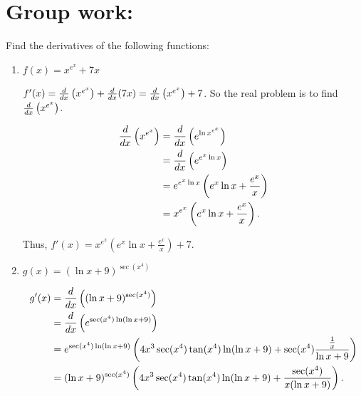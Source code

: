 \documentclass[nooutcomes]{ximera}
\begin{document}
		
		

	
	
	
	
	

\section*{Group work:}



\begin{problem}
Find the derivatives of the following functions:
	\begin{enumerate}
	
	\item  $f(x) = x^{e^x} + 7x$
		\begin{freeResponse}
		$f'(x) = \frac{d}{dx} \left(x^{e^x} \right) + \frac{d}{dx}(7x) = \frac{d}{dx} \left(x^{e^x} \right) + 7$.  So the real problem is to find $\frac{d}{dx} \left(x^{e^x} \right)$.  
		
		\begin{align*}
		\frac{d}{dx} \left( x^{e^x} \right) &= \frac{d}{dx} \left( e^{\ln x^{e^x}} \right) \\
		&= \frac{d}{dx} \left( e^{e^x \ln x} \right) \\
		&= e^{e^x \ln x} \left( e^x \ln x + \frac{e^x}{x} \right) \\
		&= x^{e^x} \left( e^x \ln x + \frac{e^x}{x} \right).
		\end{align*}
		
		Thus, $f'(x) = x^{e^x} \left( e^x \ln x + \frac{e^x}{x} \right) + 7$.  
		
		\end{freeResponse}
		
		
		
	\item  $g(x) = (\ln x + 9)^{\sec(x^4)}$
		\begin{freeResponse}
			\begin{align*}
			g'(x) &= \frac{d}{dx} \left( (\ln x + 9)^{\sec(x^4)} \right) \\
			&= \frac{d}{dx} \left( e^{\sec(x^4) \ln ( \ln x + 9) } \right) \\
			&= e^{\sec(x^4) \ln ( \ln x + 9)} \left( 4x^3 \sec(x^4) \tan(x^4) \ln(\ln x + 9) + \sec(x^4) \frac{\frac{1}{x}}{\ln x + 9} \right) \\
			&= (\ln x + 9)^{\sec(x^4)} \left( 4x^3 \sec(x^4) \tan(x^4) \ln(\ln x + 9) + \frac{\sec(x^4)}{x(\ln x + 9)} \right) .
			\end{align*}
		\end{freeResponse}
		

\end{enumerate}
\end{problem}
\end{document}
